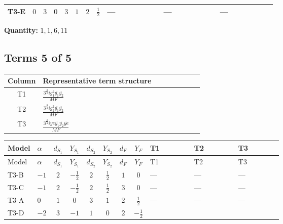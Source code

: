 \documentclass[8pt]{article}
\begin{document}
\begin{landscape}
\begin{longtable}{@{}llcccccc >{\raggedright\arraybackslash}p{0.21\linewidth} >{\raggedright\arraybackslash}p{0.21\linewidth} >{\raggedright\arraybackslash}p{0.21\linewidth}@{}}
\midrule
T3-E & $0$ & $3$ & $0$ & $3$ & $1$ & $2$ & $\frac{1}{2}$ & --- & --- & --- \\
\midrule
\bottomrule
\end{longtable}
\clearpage
\noindent\textbf{Quantity: }$\mathrm{1,1,6,11}$\par\smallskip
\subsection*{Terms 5 of 5}
\begin{center}
\begin{tabular}{@{}c >{\raggedright\arraybackslash}p{0.82\linewidth}@{}}
\toprule
Column & Representative term structure \\
\midrule
T1 & \(\displaystyle \frac{3^{\frac{3}{4}} i g_{1}^{2} \overline{y_{1}} \overline{y_{2}}}{MF}\) \\
\midrule
T2 & \(\displaystyle \frac{3^{\frac{3}{4}} i g_{2}^{2} \overline{y_{1}} \overline{y_{2}}}{MF}\) \\
\midrule
T3 & \(\displaystyle \frac{3^{\frac{3}{4}} i ye \overline{y_{1}} \overline{y_{2}} \overline{ye}}{MF}\) \\
\midrule
\bottomrule
\end{tabular}
\end{center}
\smallskip
\tiny
\begin{longtable}{@{}llcccccc >{\raggedright\arraybackslash}p{0.21\linewidth} >{\raggedright\arraybackslash}p{0.21\linewidth} >{\raggedright\arraybackslash}p{0.21\linewidth}@{}}
\toprule
Model & $\alpha$ & $d_{S_1}$ & $Y_{S_1}$ & $d_{S_2}$ & $Y_{S_2}$ & $d_F$ & $Y_F$ & T1 & T2 & T3 \\
\midrule
\endfirsthead
\toprule
Model & $\alpha$ & $d_{S_1}$ & $Y_{S_1}$ & $d_{S_2}$ & $Y_{S_2}$ & $d_F$ & $Y_F$ & T1 & T2 & T3 \\
\midrule
\endhead
T3-B & $-1$ & $2$ & $-\frac{1}{2}$ & $2$ & $\frac{1}{2}$ & $1$ & $0$ & --- & --- & --- \\
\midrule
T3-C & $-1$ & $2$ & $-\frac{1}{2}$ & $2$ & $\frac{1}{2}$ & $3$ & $0$ & --- & --- & --- \\
\midrule
T3-A & $0$ & $1$ & $0$ & $3$ & $1$ & $2$ & $\frac{1}{2}$ & --- & --- & --- \\
\midrule
T3-D & $-2$ & $3$ & $-1$ & $1$ & $0$ & $2$ & $-\frac{1}{2}$ & \scriptsize\adjustbox{max width=\linewidth}{$\begin{gathered} \frac{3^{\frac{3}{4}} i g_{1}^{2} \overline{y_{1}} \overline{y_{2}}}{8 MF}\end{gathered}$} & \scriptsize\adjustbox{max width=\linewidth}{$\begin{gathered} \frac{17 \cdot 3^{\frac{3}{4}} i g_{2}^{2} \overline{y_{1}} \overline{y_{2}}}{24 MF}\end{gathered}$} & \scriptsize\adjustbox{max width=\linewidth}{$\begin{gathered} - \frac{3^{\frac{3}{4}} i ye \overline{y_{1}} \overline{y_{2}} \overline{ye}}{12 MF}\end{gathered}$} \\

\end{longtable}
\end{landscape}
\end{document}
